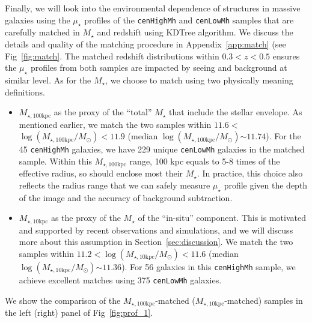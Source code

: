 \documentclass{emulateapj}
\def\rbcg{\texttt{cenHighMh}}
\def\nbcg{\texttt{cenLowMh}}
\def\mstar{{$M_{\star}$}}
\def\minn{{$M_{\star,10\mathrm{kpc}}$}}
\def\mtot{{$M_{\star,100\mathrm{kpc}}$}}
\def\logminn{{$\log (M_{\star,10\mathrm{kpc}}/M_{\odot})$}}
\def\logmtot{{$\log (M_{\star,100\mathrm{kpc}}/M_{\odot})$}}
\def\mden{{$\mu_{\star}$}}
\begin{document}
\begin{CJK*}{UTF8}{gbsn}
    Finally, we will look into the environmental dependence of structures in massive 
    galaxies using the \mden{} profiles of the \rbcg{} and \nbcg{} samples that are 
    carefully matched in \mstar{} and redshift using KDTree algorithm. 
    We discuss the details and quality of the matching procedure in 
    Appendix~\ref{app:match} (see Fig~\ref{fig:match}. 
    The matched redshift distributions within $0.3 < z < 0.5$ ensures the \mden{} 
    profiles from both samples are impacted by seeing and background at similar level. 
    As for the \mstar{}, we choose to match using two physically meaning definitions.
    
    \begin{itemize}
        \item \mtot{} as the proxy of the ``total'' \mstar{} that include the stellar 
            envelope.  As mentioned earlier, we match the two samples within 
            $11.6 < $\logmtot{}$<11.9$ (median \logmtot{}$\sim 11.74$).
            For the 45 \rbcg{} galaxies, we have 229 unique \nbcg{} galaxies in the 
            matched sample.
            Within this \mtot{} range, 100 kpc equals to 5-8 times of the effective 
            radius, so should enclose most their \mstar{}. 
            In practice, this choice also reflects the radius range that we can safely 
            measure \mden{} profile given the depth of the image and the accuracy of 
            background subtraction.
        
        \item \minn{} as the proxy of the \mstar{} of the ``in-situ'' component.
            This is motivated and supported by recent observations and simulations, 
            and we will discuss more about this assumption in 
            Section~\ref{sec:discussion}.
            We match the two samples within $11.2 < $\logminn{}$ < 11.6$ 
            (median \logminn{}$\sim 11.36$).
            For 56 galaxies in this \rbcg{} sample, we achieve excellent matches
            using 375 \nbcg{} galaxies.
    \end{itemize}
    
    We show the comparison of the \mtot{}-matched (\minn{}-matched) samples in the 
    left (right) panel of Fig~\ref{fig:prof_1}. 


\end{CJK*}
\end{document}
